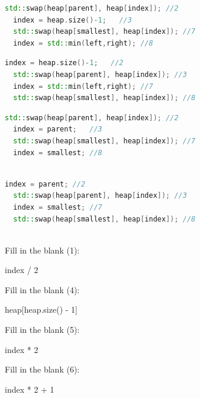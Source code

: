 \begin{parts}
\begin{subparts}
        
    \vspace{5pt}
    \begin{checkboxes}
  \choice \begin{lstlisting}[language=C++]
  std::swap(heap[parent], heap[index]); //2
  index = heap.size()-1;   //3
  std::swap(heap[smallest], heap[index]); //7
  index = std::min(left,right); //8
  \end{lstlisting}
  
  \choice \begin{lstlisting}[language=C++]
  index = heap.size()-1;   //2
  std::swap(heap[parent], heap[index]); //3
  index = std::min(left,right); //7
  std::swap(heap[smallest], heap[index]); //8
  \end{lstlisting}

  \CorrectChoice \begin{lstlisting}[language=C++]
  std::swap(heap[parent], heap[index]); //2
  index = parent;   //3
  std::swap(heap[smallest], heap[index]); //7
  index = smallest; //8
  
  \end{lstlisting}
  
  \choice \begin{lstlisting}[language=C++]
  index = parent; //2
  std::swap(heap[parent], heap[index]); //3
  index = smallest; //7
  std::swap(heap[smallest], heap[index]); //8
  
  \end{lstlisting}
\end{checkboxes}

    
    \vspace{15pt}
    \setlength{\parskip}{0.6\baselineskip}
    \subpart[1] Fill in the blank (1):
    \par\noindent index / 2
    
    \vspace{15pt}
    \subpart[1] Fill in the blank (4):
    \par\noindent heap[heap.size() - 1]

    \vspace{15pt}
    \subpart[1] Fill in the blank (5):
    \par\noindent index * 2

    \vspace{15pt}
    \subpart[1] Fill in the blank (6):
    \par\noindent index * 2 + 1
\end{subparts}



\newpage

\end{parts}
